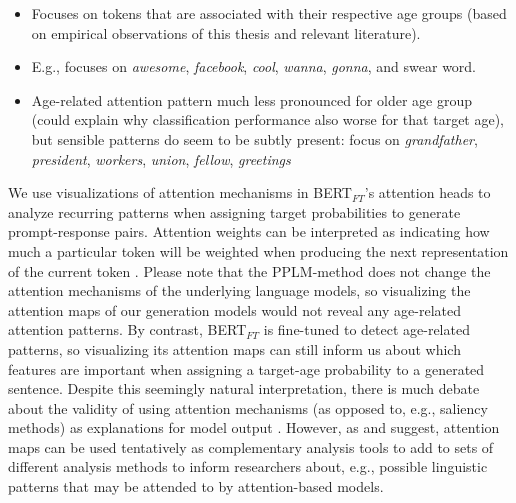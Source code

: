 \begin{itemize}
    \item Focuses on tokens that are associated with their respective age groups (based on empirical observations of this thesis and relevant literature).
    \item E.g., focuses on \textit{awesome}, \textit{facebook}, \textit{cool}, \textit{wanna}, \textit{gonna}, and swear word.
    \item Age-related attention pattern much less pronounced for older age group (could explain why classification performance also worse for that target age), but sensible patterns do seem to be subtly present: focus on \textit{grandfather}, \textit{president}, \textit{workers}, \textit{union}, \textit{fellow}, \textit{greetings}
\end{itemize}

We use visualizations of attention mechanisms \citep{vig-2019-multiscale} in BERT$_{FT}$'s attention heads to analyze recurring patterns when assigning target probabilities to generate prompt-response pairs. Attention weights can be interpreted as indicating how much a particular token will be weighted when producing the next representation of the current token \citep{DBLP:journals/corr/BahdanauCB14, clark-etal-2019-bert}. Please note that the PPLM-method does not change the attention mechanisms of the underlying language models, so visualizing the attention maps of our generation models would not reveal any age-related attention patterns. By contrast, BERT$_{FT}$ is fine-tuned to detect age-related patterns, so visualizing its attention maps can still inform us about which features are important when assigning a target-age probability to a generated sentence.  Despite this seemingly natural interpretation, there is much debate about the validity of using attention mechanisms (as opposed to, e.g., saliency methods) as explanations for model output \citep{jain-wallace-2019-attention, wiegreffe-pinter-2019-attention, bastings-filippova-2020-elephant}. However, as \cite{vig-2019-multiscale} and \cite{clark-etal-2019-bert} suggest, attention maps can be used tentatively as complementary analysis tools to add to sets of different analysis methods to inform researchers about, e.g., possible linguistic patterns that may be attended to by attention-based models. 

